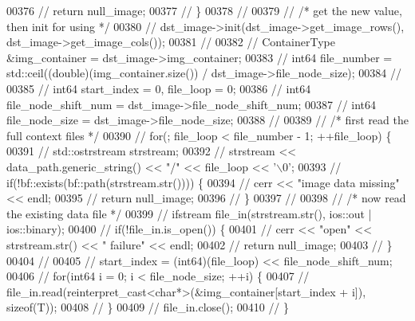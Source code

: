 \begin{DoxyCode}
00376 \textcolor{comment}{//              return null\_image;}
00377 \textcolor{comment}{//      \}}
00378 \textcolor{comment}{//}
00379 \textcolor{comment}{//      /* get the new value, then init for using */}
00380 \textcolor{comment}{//      dst\_image->init(dst\_image->get\_image\_rows(),
       dst\_image->get\_image\_cols());}
00381 \textcolor{comment}{//}
00382 \textcolor{comment}{//      ContainerType &img\_container = dst\_image->img\_container;}
00383 \textcolor{comment}{//      int64 file\_number = std::ceil((double)(img\_container.size()) /
       dst\_image->file\_node\_size);}
00384 \textcolor{comment}{//}
00385 \textcolor{comment}{//      int64 start\_index = 0, file\_loop = 0;}
00386 \textcolor{comment}{//      int64 file\_node\_shift\_num = dst\_image->file\_node\_shift\_num;}
00387 \textcolor{comment}{//      int64 file\_node\_size = dst\_image->file\_node\_size;}
00388 \textcolor{comment}{//}
00389 \textcolor{comment}{//      /* first read the full context files */}
00390 \textcolor{comment}{//      for(; file\_loop < file\_number - 1; ++file\_loop) \{}
00391 \textcolor{comment}{//              std::ostrstream strstream;}
00392 \textcolor{comment}{//              strstream << data\_path.generic\_string() << "/" << file\_loop <<
       '\(\backslash\)0';}
00393 \textcolor{comment}{//              if(!bf::exists(bf::path(strstream.str()))) \{}
00394 \textcolor{comment}{//                      cerr << "image data missing" << endl;}
00395 \textcolor{comment}{//                      return null\_image;}
00396 \textcolor{comment}{//              \}}
00397 \textcolor{comment}{//}
00398 \textcolor{comment}{//              /* now read the existing data file */}
00399 \textcolor{comment}{//              ifstream file\_in(strstream.str(), ios::out | ios::binary);}
00400 \textcolor{comment}{//              if(!file\_in.is\_open()) \{}
00401 \textcolor{comment}{//                      cerr << "open" << strstream.str() << " failure" <<
       endl;}
00402 \textcolor{comment}{//                      return null\_image;}
00403 \textcolor{comment}{//              \}}
00404 \textcolor{comment}{//}
00405 \textcolor{comment}{//              start\_index = (int64)(file\_loop) << file\_node\_shift\_num;}
00406 \textcolor{comment}{//              for(int64 i = 0; i < file\_node\_size; ++i) \{}
00407 \textcolor{comment}{//                      
      file\_in.read(reinterpret\_cast<char*>(&img\_container[start\_index + i]), sizeof(T));}
00408 \textcolor{comment}{//              \}}
00409 \textcolor{comment}{//              file\_in.close();}
00410 \textcolor{comment}{//      \}}

\end{DoxyCode}
